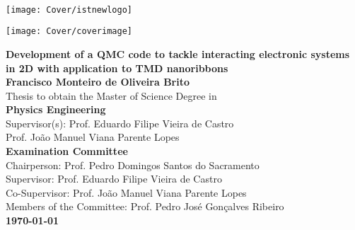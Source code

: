 \setcounter{page}{1} 


\thispagestyle{empty}

\begin{flushleft} ~\\ \vspace{-12mm} \hspace{-12mm}
\texttt{[image: Cover/istnewlogo]}
\vspace{10mm}
\\ \begin{center} \texttt{[image: Cover/coverimage]} \end{center} %
 \vspace{5mm}
\centering
\LARGE \textbf{Development of a QMC code to tackle interacting electronic systems in 2D with application to TMD nanoribbons}
\\
\vspace{15mm}
\Large \textbf{Francisco Monteiro de Oliveira Brito} \\
\vspace{12mm}
\large Thesis to obtain the Master of Science Degree in
\\ \vspace{2mm}
\LARGE \textbf{Physics Engineering}
\\ \vspace{10mm}
\large Supervisor(s): Prof. Eduardo Filipe Vieira de Castro  \\
\large Prof. João Manuel Viana Parente Lopes 
\\ \vspace{10mm}
\Large \textbf{Examination Committee}
\\ \vspace{5mm}
\large Chairperson: Prof. Pedro Domingos Santos do Sacramento \\
\large Supervisor: Prof. Eduardo Filipe Vieira de Castro \\
\large Co-Supervisor: Prof. João Manuel Viana Parente Lopes  \\
\large Members of the Committee: Prof. Pedro José Gonçalves Ribeiro \\
\vspace{5mm}
\Large \textbf{\todaythesis\today} \\
\let\thepage\relax
\end{flushleft}
\pagebreak


\clearpage

\thispagestyle{empty}
\cleardoublepage

\setcounter{page}{1} 

\baselineskip 18pt %
